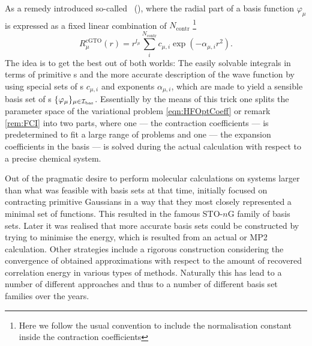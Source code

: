 As a remedy \citet{Hehre1969} introduced so-called
~(\cGTO),
where the radial part of a basis function $\varphi_\mu$
is expressed as a fixed linear combination of $N_\text{contr}$
%
\footnote{Here we follow the usual convention to include the normalisation constant
	inside the contraction coefficients}
\[ R^\text{cGTO}_\mu(r) = r^{l_\mu} \sum_i^{N_\text{contr}} c_{\mu,i} \exp(-\alpha_{\mu,i} r^2). \]
The idea is to get the best out of both worlds:
The easily solvable integrals in terms of primitive {\GTO}s
and the more accurate description of the wave function by using
special sets of s
$c_{\mu,i}$ and exponents $\alpha_{\mu,i}$,
which are made to yield
a sensible basis set of {\cGTO}s $\{\varphi_\mu\}_{\mu\in\mathcal{I}_\text{bas}}$.
Essentially by the means of this trick
one splits the parameter space of the variational problem
\eqref{eqn:HFOptCoeff} or remark \ref{rem:FCI}
into two parts,
where one --- the contraction coefficients ---
is predetermined to fit a large range of problems
and one --- the expansion coefficients in the basis ---
is solved during the actual calculation with respect to a precise
chemical system.

Out of the pragmatic desire to perform molecular calculations
on systems larger than what was feasible with \STO basis sets at that time,
\citet{Hehre1969} initially focused on contracting primitive Gaussians
in a way that they most closely represented a minimal set of \STO functions.
This resulted in the famous STO-$n$G family of basis sets.
Later it was realised that more accurate basis sets could be constructed
by trying to minimise the energy,
which is resulted from an actual \HF or MP2 calculation.
Other strategies include a rigorous construction
considering the convergence of obtained approximations
with respect to the amount of recovered correlation energy
in various types of methods.
Naturally this has lead to a number of different approaches
and thus to a number of different basis set families over the years.

